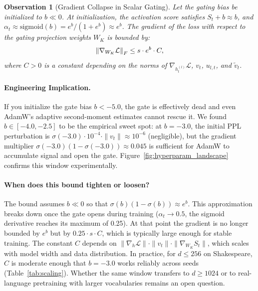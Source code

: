 \documentclass[preprint,12pt]{elsarticle}
\newtheorem{observation}[theorem]{Observation}
\newcommand{\sigmoid}{\mathrm{sigmoid}}
\DeclarePairedDelimiter{\norm}{\lVert}{\rVert}
\begin{document}
\begin{observation}[Gradient Collapse in Scalar Gating]
Let the gating bias be initialized to $b \ll 0$. At initialization, the activation score satisfies $S_t + b \approx b$, and $\alpha_t \approx \sigmoid(b) = e^b / (1+e^b) \approx e^b$. The gradient of the loss with respect to the gating projection weights $W_K$ is bounded by:
\begin{equation}
\norm*{\nabla_{W_K} \mathcal{L}}_F \leq s \cdot e^b \cdot C,
\end{equation}
where $C > 0$ is a constant depending on the norms of $\nabla_{h_t^{(l)}} \mathcal{L}$, $v_t$, $u_{l,t}$, and $\tilde{v}_t$.
\end{observation}



\paragraph{Engineering Implication.} If you initialize the gate bias $b < -5.0$, the gate is effectively dead and even AdamW's adaptive second-moment estimates cannot rescue it. We found $b \in [-4.0, -2.5]$ to be the empirical sweet spot: at $b = -3.0$, the initial PPL perturbation is $\sigma(-3.0) \cdot 10^{-4} \cdot \|v_t\| \approx 10^{-6}$ (negligible), but the gradient multiplier $\sigma(-3.0)(1-\sigma(-3.0)) \approx 0.045$ is sufficient for AdamW to accumulate signal and open the gate. Figure~\ref{fig:hyperparam_landscape} confirms this window experimentally.

\paragraph{When does this bound tighten or loosen?} The bound assumes $b \ll 0$ so that $\sigma(b)(1-\sigma(b)) \approx e^b$. This approximation breaks down once the gate opens during training ($\alpha_t \to 0.5$, the sigmoid derivative reaches its maximum of 0.25). At that point the gradient is no longer bounded by $e^b$ but by $0.25 \cdot s \cdot C$, which is typically large enough for stable training. The constant $C$ depends on $\|\nabla_{h} \mathcal{L}\| \cdot \|v_t\| \cdot \|\nabla_{W_K} S_t\|$, which scales with model width and data distribution. In practice, for $d \leq 256$ on Shakespeare, $C$ is moderate enough that $b = -3.0$ works reliably across seeds (Table~\ref{tab:scaling}). Whether the same window transfers to $d \geq 1024$ or to real-language pretraining with larger vocabularies remains an open question.
\end{document}
